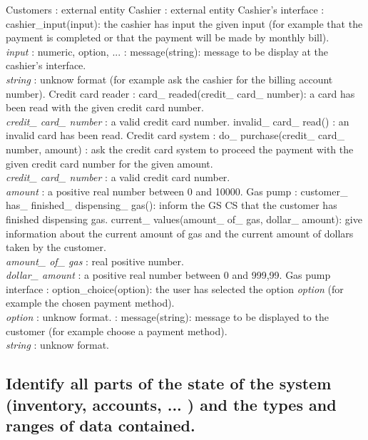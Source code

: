 \documentclass[11pt,a4paper]{article}
\begin{document}
\begin{outline}
	\1 Customers : external entity
	\1 Cashier : external entity
	\1 Cashier's interface 
		\2[IN] :
			\3 cashier\_input(input): the cashier has input the given input (for example that the payment is completed or that the payment will be made by monthly bill). \\
				\textit{input} : numeric, option, ...
		\2[OUT]	:	
			\3 message(string): message to be display at the cashier’s interface. \\
				\textit{string} : unknow format (for example ask the cashier for the billing account number).
	\1 Credit card reader
		\2[IN] :
			\3 card\_ readed(credit\_ card\_ number): a card has been read with the given credit card number. \\
				\textit{credit\_ card\_ number} : a valid credit card number.
			\3 invalid\_ card\_ read() : an invalid card has been read.
	\1 Credit card system 
		\2[OUT]	:	
			\3 do\_ purchase(credit\_ card\_ number, amount) : ask the credit card system to proceed the payment with the given credit card number for the given amount. \\
				\textit{credit\_ card\_ number} : a valid credit card number. \\
				\textit{amount} : a positive real number between 0 and 10000.
	\1 Gas pump
		\2[IN] :
			\3 customer\_ has\_ finished\_ dispensing\_ gas(): inform the GS CS that the customer has finished dispensing gas.
			\3 current\_ values(amount\_ of\_ gas, dollar\_ amount): give information about the current amount of gas and the current amount of dollars taken by the customer. \\
				\textit{amount\_ of\_ gas} : real positive number. \\
				\textit{dollar\_ amount} : a positive real number between 0 and 999,99.
	\1 Gas pump interface 
		\2[IN] :
			\3 option\_choice(option): the user has selected the option \textit{option} (for example the chosen payment method). \\
				\textit{option} : unknow format.
		\2[OUT]	:	
			\3 message(string): message to be displayed to the customer (for example choose a payment method). \\
				\textit{string} : unknow format.
\end{outline}



\subsection*{Identify all parts of the state of the system (inventory, accounts, ... ) and the types and ranges of data contained.}
\end{document}
